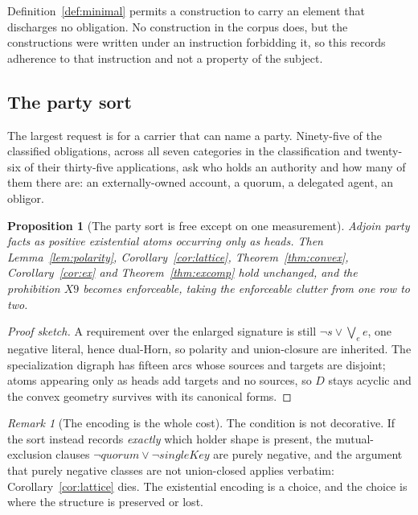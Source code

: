\documentclass[11pt,reqno]{amsart}
\theoremstyle{plain}
\newtheorem{proposition}[theorem]{Proposition}
\theoremstyle{definition}
\theoremstyle{remark}
\newtheorem{remark}[theorem]{Remark}
\begin{document}
Definition~\ref{def:minimal} permits a construction to carry an element
that discharges no obligation. No construction in the corpus does, but the
constructions were written under an instruction forbidding it, so this
records adherence to that instruction and not a property of the subject.

\subsection{The party sort}

The largest request is for a carrier that can name a party. Ninety-five of the
classified obligations, across all seven categories in the classification and
twenty-six of their thirty-five applications, ask who holds an authority and how
many of them there are: an externally-owned account, a quorum, a delegated
agent, an obligor.

\begin{proposition}[The party sort is free except on one measurement]\label{prop:party}
Adjoin party facts as positive existential atoms occurring only as heads. Then
Lemma~\ref{lem:polarity}, Corollary~\ref{cor:lattice},
Theorem~\ref{thm:convex}, Corollary~\ref{cor:ex} and
Theorem~\ref{thm:excomp} hold unchanged, and the prohibition $X9$ becomes
enforceable, taking the enforceable clutter from one row to two.
\end{proposition}

\begin{proof}[Proof sketch]
A requirement over the enlarged signature is still $\neg s \vee \bigvee_e e$,
one negative literal, hence dual-Horn, so polarity and union-closure are
inherited. The specialization digraph has fifteen arcs whose sources and targets
are disjoint; atoms appearing only as heads add targets and no sources, so $D$
stays acyclic and the convex geometry survives with its canonical forms.
\end{proof}

\begin{remark}[The encoding is the whole cost]
The condition is not decorative. If the sort instead records \emph{exactly}
which holder shape is present, the mutual-exclusion clauses $\neg\mathit{quorum}
\vee \neg\mathit{singleKey}$ are purely negative, and the argument that purely
negative classes are not union-closed applies verbatim:
Corollary~\ref{cor:lattice} dies. The existential encoding is a choice, and the
choice is where the structure is preserved or lost.
\end{remark}
\end{document}
